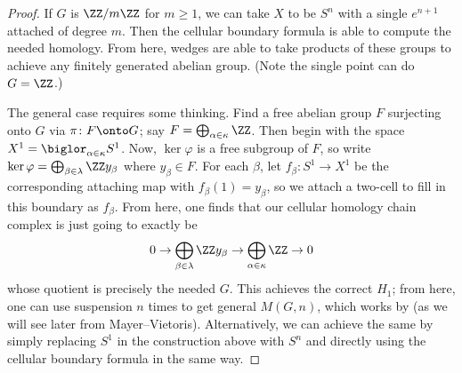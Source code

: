 \documentclass[../notes.tex]{subfiles}
\begin{document}
\begin{proof}
	If $G$ is $\ZZ/m\ZZ$ for $m\ge1$, we can take $X$ to be $S^n$ with a single $e^{n+1}$ attached of degree $m$. Then the cellular boundary formula is able to compute the needed homology. From here, wedges are able to take products of these groups to achieve any finitely generated abelian group. (Note the single point can do $G=\ZZ$.)

	The general case requires some thinking. Find a free abelian group $F$ surjecting onto $G$ via $\pi\colon F\onto G$; say $F=\bigoplus_{\alpha\in\kappa}\ZZ$. Then begin with the space $X^1=\biglor_{\alpha\in\kappa}S^1$. Now, $\ker\varphi$ is a free subgroup of $F$, so write $\ker\varphi=\bigoplus_{\beta\in\lambda}\ZZ y_\beta$ where $y_\beta\in F$. For each $\beta$, let $f_\beta\colon S^1\to X^1$ be the corresponding attaching map with $f_\beta(1)=y_\beta$, so we attach a two-cell to fill in this boundary as $f_\beta$. From here, one finds that our cellular homology chain complex is just going to exactly be
	\[0\to\bigoplus_{\beta\in\lambda}\ZZ y_\beta\to\bigoplus_{\alpha\in\kappa}\ZZ\to0\]
	whose quotient is precisely the needed $G$. This achieves the correct $H_1$; from here, one can use suspension $n$ times to get general $M(G,n)$, which works by  (as we will see later from Mayer--Vietoris). Alternatively, we can achieve the same by simply replacing $S^1$ in the construction above with $S^n$ and directly using the cellular boundary formula in the same way.
\end{proof}
\end{document}

